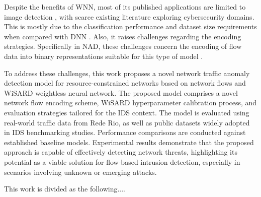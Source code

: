 Despite the benefits of WNN, most of its published applications are limited to image detection \cite{di:2020}, with scarce existing literature exploring cybersecurity domains. This is mostly due to the classification performance and dataset size requirements when compared with DNN \cite{miranda:2022, susskind:2022}. Also, it raises challenges regarding the encoding strategies. Specifically in NAD, these challenges concern the encoding of flow data into binary representations suitable for this type of model \cite{kappaun:2016}.

To address these challenges, this work proposes a novel network traffic anomaly detection model for resource-constrained networks based on network flows and WiSARD weightless neural network. The proposed model comprises a novel network flow encoding scheme, WiSARD hyperparameter calibration process, and evaluation strategies tailored for the IDS context. The model is evaluated using real-world traffic data from Rede Rio, as well as public datasets widely adopted in IDS benchmarking studies. Performance comparisons are conducted against established baseline models. Experimental results demonstrate that the proposed approach is capable of effectively detecting network threats, highlighting its potential as a viable solution for flow-based intrusion detection, especially in scenarios involving unknown or emerging attacks.

This work is divided as the following....